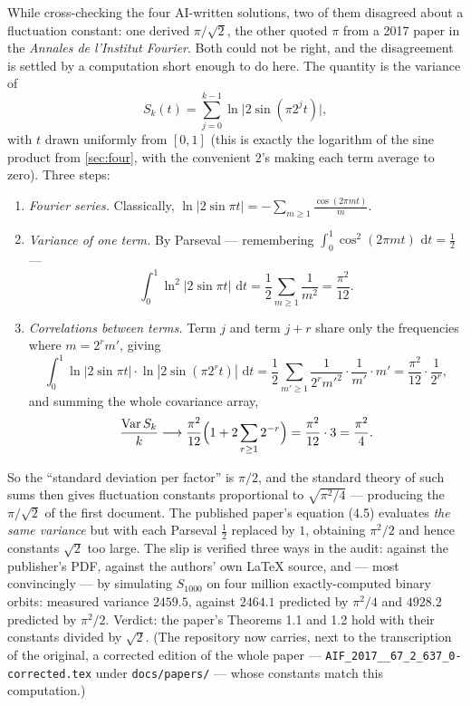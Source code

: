 \documentclass[11pt,oneside]{article}
\theoremstyle{remark}
\newcommand{\dd}{\,\mathrm d}
\begin{document}
While cross-checking the four AI-written solutions, two of them
disagreed about a fluctuation constant: one derived
$\pi/\sqrt2$, the other quoted $\pi$ from a 2017 paper in the
\emph{Annales de l'Institut Fourier}.  Both could not be right, and
the disagreement is settled by a computation short enough to do here.
The quantity is the variance of
\[
 S_k(t)=\sum_{j=0}^{k-1}\ln\bigl|2\sin(\pi 2^jt)\bigr| ,
\]
with $t$ drawn uniformly from $[0,1]$ (this is exactly the logarithm
of the sine product from \cref{sec:four}, with the convenient
$2$'s making each term average to zero).  Three steps:

\begin{enumerate}
\item \emph{Fourier series.}  Classically,
$\ln|2\sin\pi t|=-\sum_{m\ge1}\frac{\cos(2\pi mt)}{m}$.
\item \emph{Variance of one term.}  By Parseval --- remembering
$\int_0^1\cos^2(2\pi mt)\,\dd t=\tfrac12$ ---
\[
 \int_0^1\ln^2|2\sin\pi t|\,\dd t
 =\frac12\sum_{m\ge1}\frac1{m^2}
 =\frac{\pi^2}{12}.
\]
\item \emph{Correlations between terms.}  Term $j$ and term $j+r$
share only the frequencies where $m=2^r m'$, giving
\[
 \int_0^1\ln|2\sin\pi t|\cdot\ln|2\sin(\pi 2^rt)|\,\dd t
 =\frac12\sum_{m'\ge1}\frac{1}{2^rm'^2}\cdot\frac1{m'}\cdot m'
 =\frac{\pi^2}{12}\cdot\frac{1}{2^r},
\]
and summing the whole covariance array,
\[
 \frac{\operatorname{Var}S_k}{k}\longrightarrow
 \frac{\pi^2}{12}\Bigl(1+2\sum_{r\ge1}2^{-r}\Bigr)
 =\frac{\pi^2}{12}\cdot3
 =\frac{\pi^2}{4}.
\]
\end{enumerate}
So the ``standard deviation per factor'' is $\pi/2$, and the standard
theory of such sums then gives fluctuation constants proportional to
$\sqrt{\pi^2/4}$ --- producing the $\pi/\sqrt2$ of the first document.
The published paper's equation (4.5) evaluates \emph{the same
variance} but with each Parseval $\tfrac12$ replaced by $1$, obtaining
$\pi^2/2$ and hence constants $\sqrt2$ too large.  The slip is
verified three ways in the audit: against the publisher's PDF, against
the authors' own \LaTeX{} source, and --- most convincingly --- by
simulating $S_{1000}$ on four million exactly-computed binary orbits:
measured variance $2459.5$, against $2464.1$ predicted by
$\pi^2/4$ and $4928.2$ predicted by $\pi^2/2$.  Verdict: the paper's
Theorems 1.1 and 1.2 hold with their constants divided by $\sqrt2$.
(The repository now carries, next to the transcription of the original,
a corrected edition of the whole paper ---
\nolinkurl{AIF_2017__67_2_637_0-corrected.tex} under
\nolinkurl{docs/papers/} --- whose constants match this computation.)
\end{document}
